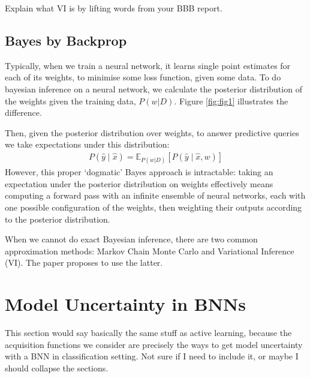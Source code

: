 \documentclass[11pt, a4paper, bibliography=totoc]{report}
\newcommand{\E}[2]{\mathbb{E}_{#1} \left[ #2 \right] }
\begin{document}
Explain what VI is by lifting words from your BBB report.

\subsection{Bayes by Backprop}
Typically, when we train a neural network, it learns single point estimates for each of its weights, to minimise some loss function, given some data. To do bayesian inference on a neural network, we calculate the posterior distribution of the weights given the training data, $ P(w|D) $. Figure \ref{fig:fig1} illustrates the difference.

Then, given the posterior distribution over weights, to answer predictive queries we take expectations under this distribution:
\begin{align*}
P(\hat{y} \mid \hat{x}) = \E{ P(w|D) }{P(\hat{y} \mid \hat{x}, w) }
\end{align*}
However, this proper ‘dogmatic’ Bayes approach is intractable: taking an expectation under the posterior distribution on weights effectively means computing a forward pass with an infinite ensemble of neural networks, each with one possible configuration of the weights, then weighting their outputs according to the posterior distribution.

When we cannot do exact Bayesian inference, there are two common approximation methods: Markov Chain Monte Carlo and Variational Inference (VI). The paper proposes to use the latter.



\section{Model Uncertainty in BNNs}
This section would say basically the same stuff as active learning, because the acquisition functions we consider are precisely the ways to get model uncertainty with a BNN in classification setting.
Not sure if I need to include it, or maybe I should collapse the sections.
\end{document}
